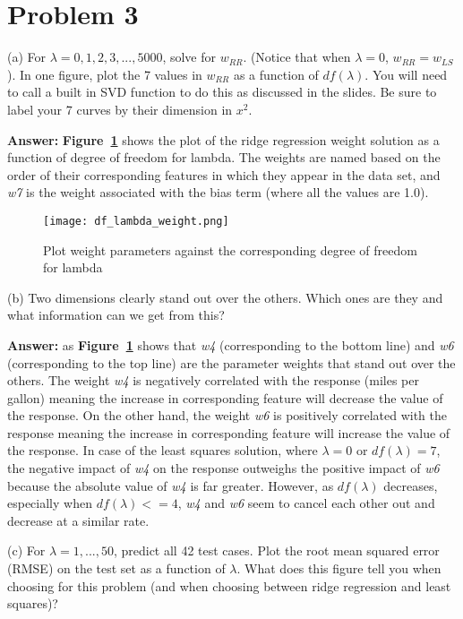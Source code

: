 \documentclass[11pt]{report}
\begin{document}
\pagebreak

\section{Problem 3}
(a) For $\lambda = 0, 1, 2 ,3, ..., 5000$, solve for $w_{RR}$. (Notice that when $\lambda = 0$, $w_{RR} = w_{LS}$). In one figure, plot the 7 values in $w_{RR}$ as a function of $df(\lambda)$. You will need to call a built in SVD function to do this as discussed in the slides. Be sure to label your 7 curves by their dimension in ${x^2}$.

\justify
\textbf{Answer:} \textbf{Figure~\ref{fig:df_lambda_weight}}  shows the plot of the ridge regression weight solution as a function of degree of freedom for lambda. The weights are named based on the order of their corresponding features in which they appear in the data set, and \emph{w7} is the weight associated with the bias term (where all the values are 1.0). 

\begin{figure}[h]
\texttt{[image: df\_lambda\_weight.png]}
\centering
\caption{Plot weight parameters against the corresponding degree of freedom for lambda}
\label{fig:df_lambda_weight}
\end{figure}

\justify
(b) Two dimensions clearly stand out over the others. Which ones are they and what information can
we get from this?

\justify
\textbf{Answer:} as \textbf{Figure~\ref{fig:df_lambda_weight}} shows that \emph{w4} (corresponding to the bottom line) and \emph{w6} (corresponding to the top line) are the parameter weights that stand out over the others. The weight \emph{w4} is negatively correlated with the response (miles per gallon) meaning the increase in corresponding feature will decrease the value of the response. On the other hand, the weight \emph{w6} is positively correlated with the response meaning the increase in corresponding feature will increase the value of the response. In case of the least squares solution, where $\lambda=0$ or $df(\lambda) = 7$,  the negative impact of \emph{w4}  on the response outweighs the positive impact of \emph{w6} because the absolute value of \emph{w4} is far greater. However, as $df(\lambda)$ decreases, especially when $df(\lambda) <= 4$,  \emph{w4} and \emph{w6} seem to cancel each other out and decrease at a similar rate.

\justify
(c) For $\lambda = 1, ..., 50$, predict all 42 test cases. Plot the root mean squared error (RMSE) on the test set as a function of $\lambda$. What does this figure tell you when choosing for this problem (and when choosing between ridge regression and least squares)?
\end{document}
